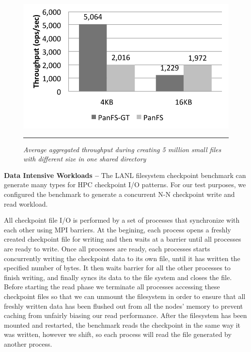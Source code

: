 \begin{figure}[t]  %
\centerline{\includegraphics[scale=0.7]{./figs/small_file_creates}}
\vspace{10pt}
\caption{\footnotesize
\textit{Average aggregated throughput during creating 5 million small files
with different size in one shared directory}
}
\hrule
\label{graph:smallfiles}
\end{figure}       %



\textbf{Data Intensive Workloads -- }
The LANL filesystem checkpoint benchmark can
generate many types for HPC checkpoint I/O patterns.
For our test purposes, we configured the benchmark to generate
a concurrent N-N checkpoint write and read workload.

All checkpoint file I/O is performed by a set of processes
that synchronize with each other using MPI barriers.
At the begining, each process opens a freshly created checkpoint file
for writing and then waits at a barrier until all processes are ready to write.
Once all processes are ready, each processes starts
concurrently writing the checkpoint data to its own file,
until it has written the specified number of bytes.
It then waits barrier for all the other processes to finish writing,
and finally syncs its data to the file system and closes the file.
Before starting the read phase we terminate all processes
accessing these checkpoint files so that
we can unmount the filesystem in order to ensure that
all freshly written data has been flushed out from all the nodes' memory
to prevent caching from unfairly biasing our read performance.
After the filesystem has been mounted and restarted,
the benchmark reads the checkpoint in the same way it was written,
however we shift, so each process will read
the file generated by another process.

